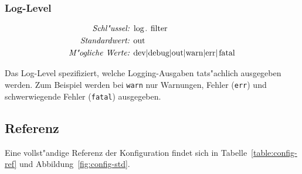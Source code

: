 \subsubsection{Log-Level}

\begin{align*}
    \emph{Schl"ussel: } & \lstinline{log.filter}\\
    \emph{Standardwert: } & \lstinline{out}\\
    \emph{M"ogliche Werte: } & \lstinline{dev|debug|out|warn|err|fatal}
\end{align*}

Das Log-Level spezifiziert, welche Logging-Ausgaben tats"achlich
ausgegeben werden. Zum Beispiel werden bei \lstinline{warn}
nur Warnungen, Fehler (\lstinline{err}) und schwerwiegende Fehler
(\lstinline{fatal}) ausgegeben.

\subsection{Referenz}

Eine vollst"andige Referenz der Konfiguration
findet sich in Tabelle~\ref{table:config-ref}
und Abbildung~\ref{fig:config-std}.



